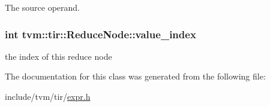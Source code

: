 The source operand. 

\subsubsection[{\texorpdfstring{value\+\_\+index}{value_index}}]{\setlength{\rightskip}{0pt plus 5cm}int tvm\+::tir\+::\+Reduce\+Node\+::value\+\_\+index}\hypertarget{classtvm_1_1tir_1_1ReduceNode_a3e27c310483199b33784b1b98e3787af}{}\label{classtvm_1_1tir_1_1ReduceNode_a3e27c310483199b33784b1b98e3787af}


the index of this reduce node 



The documentation for this class was generated from the following file\+:\begin{DoxyCompactItemize}
\item 
include/tvm/tir/\hyperlink{tir_2expr_8h}{expr.\+h}\end{DoxyCompactItemize}
